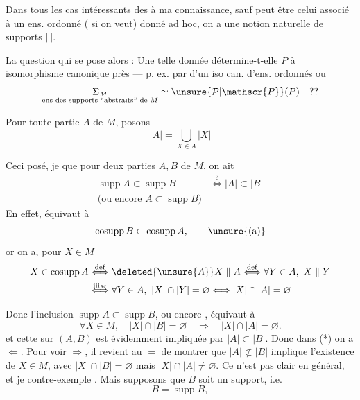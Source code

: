 Dans tous les cas intéressants des  à ma connaissance, sauf peut être celui  associé à un ens. ordonné ( si on veut) donné ad hoc, on a une notion naturelle de supports $|\ |$.

La question qui se pose alors : Une telle donnée détermine-t-elle $P$ à isomorphisme canonique près --- p. ex. par  d'un iso can. d'ens. ordonnés ou   \unsure{(}
\[
\underset{\text{ens des supports ``abstraits'' de }M}{\Sigma_M}
\simeq\unsure{\mathcal{P}|\mathscr{P}}(P)\quad??
\]

Pour toute partie $A$ de $M$, posons
\[
|A|=\bigcup_{X\in A}|X|
\]

Ceci posé, je   que pour deux parties $A,B$ de $M$, on ait
\[
\begin{aligned}
\operatorname{supp}A\subset\operatorname{supp}B
&\overset{?}{\Longleftrightarrow}|A|\subset|B|\\
\text{(ou encore }A\subset\operatorname{supp}B\text{)}&
\end{aligned}
\tag*{(*)}
\]
En effet,     équivaut à
\[
\operatorname{cosupp}B\subset\operatorname{cosupp}A,
\tag*{\unsure{(a)}}
\]
or  on a, pour $X\in M$
\[
\begin{aligned}
X\in\operatorname{cosupp}A
&\overset{\mathrm{def}}{\Longleftrightarrow}\deleted{\unsure{A}}X\parallel A
\overset{\mathrm{def}}{\Longleftrightarrow}\forall Y\in A,\ X\parallel Y\\
&\overset{\mathrm{iii}_M}{\Longleftrightarrow}\forall Y\in A,\ |X|\cap|Y|=\varnothing
\Longleftrightarrow |X|\cap|A|=\varnothing
\end{aligned}
\]

Donc l'inclusion $\operatorname{supp}A\subset\operatorname{supp}B$, ou encore , équivaut à
\[
\forall X\in M,\quad |X|\cap|B|=\varnothing\quad\Longrightarrow\quad |X|\cap|A|=\varnothing.
\tag*{($\bullet$)}
\]
et cette   sur $(A,B)$ est évidemment impliquée par $|A|\subset|B|$. Donc dans (*) on a $\Longleftarrow$. Pour voir $\Longrightarrow$, il revient au $=$ de montrer que  $|A|\not\subset|B|$ implique l'existence de $X\in M$, avec $|X|\cap|B|=\varnothing$ mais $|X|\cap|A|\ne\varnothing$. Ce n'est pas clair en général, et je   contre-exemple . Mais supposons que $B$ soit un support, i.e.\ 
\[
B=\operatorname{supp}B,
\]

